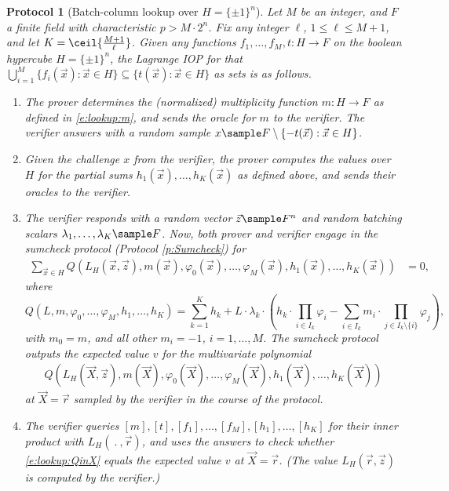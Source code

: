 \documentclass[11pt]{article}
\newtheorem{protocol}[]{Protocol}
\theoremstyle{definition}
\theoremstyle{definition}
\begin{document}
\begin{protocol}[Batch-column lookup over $H=\{\pm 1\}^n$]
\label{prot:lookup}
Let $M$ be an integer, and $F$ a finite field with characteristic $p > M\cdot 2^n$. 
Fix any integer $\ell$, $1\leq \ell\leq M+1$, and let $K=\ceil{\frac{M+1}{\ell}}$.
Given any functions $f_1, \ldots, f_M, t :H\rightarrow F$ on the boolean hypercube $H=\{\pm 1\}^n$, the Lagrange IOP for that $\bigcup_{i=1}^M\{f_i(\vec x) : \vec x\in H\}\subseteq \{t(\vec x) : \vec x\in H\}$ as sets is as follows.

\begin{enumerate} 
\item
The prover determines the (normalized) multiplicity function $m:H\rightarrow F$ as defined in \eqref{e:lookup:m},
and sends the oracle for $m$ to the verifier.
The verifier answers with a random sample $x\sample F\setminus \{- t(\vec x) : \vec x\in H\}$. 

\item
\label{i:lookup:step1}
Given the challenge $x$ from the verifier, the prover computes the values over $H$ for the partial sums $h_1(\vec x), \ldots, h_K(\vec x)$ as defined above, and sends their oracles to the verifier.

\item
\label{i:lookup:step2}
The verifier responds with a random vector $\vec z \sample F^n$ and random batching scalars $\lambda_1,\ldots, \lambda_K\sample F$.
Now, both prover and verifier engage in the sumcheck protocol (Protocol \ref{p:Sumcheck}) for 
\begin{align*} 
\sum_{\vec x \in H} Q(L_H(\vec x, \vec z),  m(\vec x),  \varphi_0(\vec x), \ldots, \varphi_M(\vec x),  h_1(\vec x),\ldots, h_K(\vec x))&= 0,
\end{align*}
where  %
\begin{equation}
\label{e:lookup:Q}
Q(L, m, \varphi_0,\ldots, \varphi_M,  h_1, \ldots, h_K) =   
\sum_{k=1}^K h_k  + L \cdot \lambda_k \cdot \left(h_k \cdot \prod_{i\in I_k} \varphi_i - \sum_{i\in I_k} m_i\cdot \prod_{j\in I_k\setminus\{i\}} \varphi_j \right),
\end{equation}
with $m_0 = m$, and all other $m_i = -1$, $i=1,\ldots, M$.
The sumcheck protocol outputs the expected value $v$ for the multivariate polynomial 
\begin{equation}
\label{e:lookup:QinX}
\begin{aligned}
Q(L_H(\vec X, \vec z), m(\vec X), \varphi_0(\vec X),\ldots, \varphi_M(\vec X),  h_1(\vec X),\ldots, h_K(\vec X))
\end{aligned}
\end{equation}
at $\vec X=\vec r$ sampled by the verifier in the course of the protocol.

\item
The verifier queries $[m], [t], [f_1], \ldots, [f_M], [h_1], \ldots, [h_K]$ for their inner product with $L_H(\:.\:,\vec r)$, and uses the answers 
to check whether \eqref{e:lookup:QinX} equals the expected value $v$ at $\vec X = \vec r$. 
(The value $L_H(\vec r, \vec z)$ is computed by the verifier.)
\end{enumerate}
\end{protocol}
\end{document}
